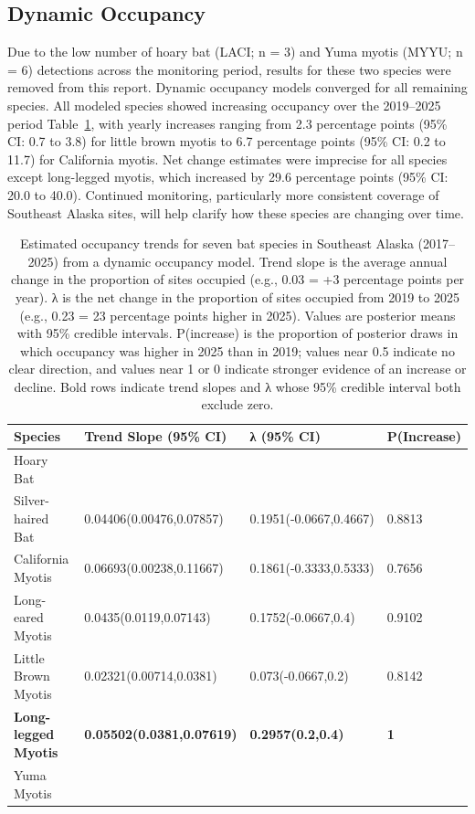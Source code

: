 \documentclass[
  letterpaper,
  DIV=11,
  numbers=noendperiod]{scrartcl}
\begin{document}
\subsection{Dynamic Occupancy}\label{dynamic-occupancy-1}

Due to the low number of hoary bat (LACI; n = 3) and Yuma myotis (MYYU;
n = 6) detections across the monitoring period, results for these two
species were removed from this report. Dynamic occupancy models
converged for all remaining species. All modeled species showed
increasing occupancy over the 2019--2025 period
Table~\ref{tbl-occ-trends}, with yearly increases ranging from 2.3
percentage points (95\% CI: 0.7 to 3.8) for little brown myotis to 6.7
percentage points (95\% CI: 0.2 to 11.7) for California myotis. Net
change estimates were imprecise for all species except long-legged
myotis, which increased by 29.6 percentage points (95\% CI: 20.0 to
40.0). Continued monitoring, particularly more consistent coverage of
Southeast Alaska sites, will help clarify how these species are changing
over time.

\begin{longtable}[l]{llll}

\caption{\label{tbl-occ-trends}Estimated occupancy trends for seven bat
species in Southeast Alaska (2017--2025) from a dynamic occupancy model.
Trend slope is the average annual change in the proportion of sites
occupied (e.g., 0.03 = +3 percentage points per year). λ is the net
change in the proportion of sites occupied from 2019 to 2025 (e.g., 0.23
= 23 percentage points higher in 2025). Values are posterior means with
95\% credible intervals. P(increase) is the proportion of posterior
draws in which occupancy was higher in 2025 than in 2019; values near
0.5 indicate no clear direction, and values near 1 or 0 indicate
stronger evidence of an increase or decline. Bold rows indicate trend
slopes and λ whose 95\% credible interval both exclude zero.}

\tabularnewline

\toprule
Species & Trend Slope (95\% CI) & λ (95\% CI) & P(Increase)\\
\midrule
Hoary Bat &  &  & \\
Silver-haired Bat & 0.04406(0.00476,0.07857) & 0.1951(-0.0667,0.4667) & 0.8813\\
California Myotis & 0.06693(0.00238,0.11667) & 0.1861(-0.3333,0.5333) & 0.7656\\
Long-eared Myotis & 0.0435(0.0119,0.07143) & 0.1752(-0.0667,0.4) & 0.9102\\
Little Brown Myotis & 0.02321(0.00714,0.0381) & 0.073(-0.0667,0.2) & 0.8142\\
\addlinespace
\textbf{Long-legged Myotis} & \textbf{0.05502(0.0381,0.07619)} & \textbf{0.2957(0.2,0.4)} & \textbf{1}\\
Yuma Myotis &  &  & \\
\bottomrule

\end{longtable}
\end{document}
